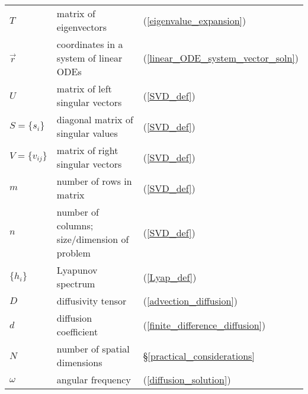 \begin{tabular}{lll}
	$T$ & matrix of eigenvectors & (\ref{eigenvalue_expansion}) \\
	$\vec r$ & coordinates in a system of linear ODEs & (\ref{linear_ODE_system_vector_soln}) \\
	$U$ & matrix of left singular vectors & (\ref{SVD_def}) \\
	$S=\lbrace s_i \rbrace$ & diagonal matrix of singular values & (\ref{SVD_def}) \\
	$V=\lbrace v_{ij} \rbrace$ & matrix of right singular vectors & (\ref{SVD_def}) \\
	$m$ & number of rows in matrix & (\ref{SVD_def}) \\
	$n$ & number of columns; size/dimension of problem & (\ref{SVD_def}) \\
	$\lbrace h_i \rbrace$ & Lyapunov spectrum & (\ref{Lyap_def}) \\
	$D$ & diffusivity tensor & (\ref{advection_diffusion}) \\
	$d$ & diffusion coefficient & (\ref{finite_difference_diffusion}) \\
	$N$ & number of spatial dimensions & \S \ref{practical_considerations} \\
	$\omega$ & angular frequency & (\ref{diffusion_solution})
\end{tabular}

